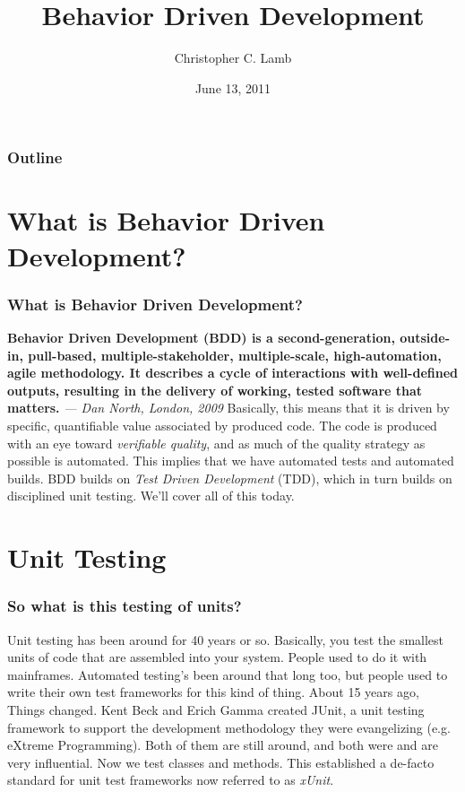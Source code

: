 \documentclass[t, 10pt]{beamer}
\title{Behavior Driven Development}
\author [Chris]{Christopher C. Lamb}
\institute[University of New Mexico]{
\inst {}Department of Electrical and Computer Engineering\\
University of New Mexico}
\date{June 13, 2011}
\begin{document}
\begin{frame}
\titlepage
\end{frame}


\begin{frame}
\frametitle{Outline}
\tableofcontents 
\end{frame}

\section{What is Behavior Driven Development?}

\begin{frame}
\frametitle{What is Behavior Driven Development?}
\textbf{Behavior Driven Development (BDD) is a second-generation, outside-in, pull-based, multiple-stakeholder, multiple-scale, high-automation, agile methodology. It describes a cycle of interactions with well-defined outputs, resulting in the delivery of working, tested software that matters.}
\newline
\textit{--- Dan North, London, 2009}
\newline
\newline
\newline
\pause
Basically, this means that it is driven by specific, quantifiable value associated by produced code.  The code is produced with an eye toward \textit{verifiable quality}, and as much of the quality strategy as possible is automated.  This implies that we have automated tests and automated builds.  BDD builds on \textit{Test Driven Development} (TDD), which in turn builds on disciplined unit testing.  We'll cover all of this today.
\end{frame}

\section{Unit Testing}

\begin{frame}
\frametitle{So what is this testing of units?}
Unit testing has been around for 40 years or so.  Basically, you test the smallest units of code that are assembled into your system.  People used to do it with mainframes.  Automated testing's been around that long too, but people used to write their own test frameworks for this kind of thing.  About 15 years ago, Things changed.
\pause
\newline
\newline
Kent Beck and Erich Gamma created JUnit, a unit testing framework to support the development methodology they were evangelizing (e.g. eXtreme Programming).  Both of them are still around, and both were and are very influential.  Now we test classes and methods.
\newline
\newline
This established a de-facto standard for unit test frameworks now referred to as \textit{xUnit}.
\end{frame}
\end{document}
